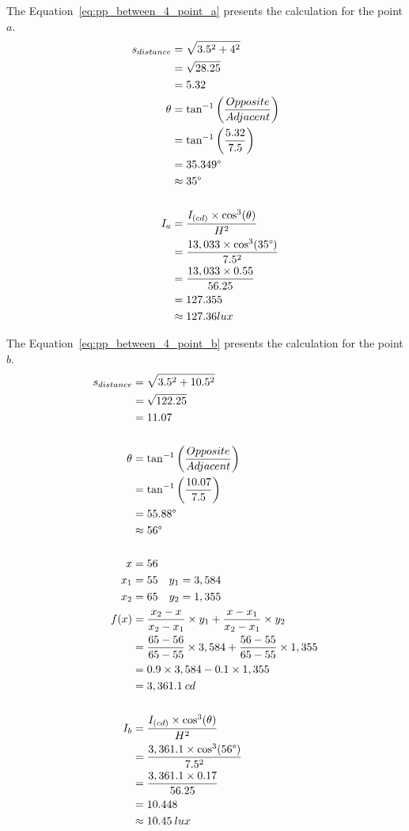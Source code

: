 The Equation~\ref{eq:pp_between_4_point_a} presents the calculation for the point $a$.
\begin{equation}
\begin{split}
s_{distance} & = \sqrt{3.5^2 + 4^2} \\
 & = \sqrt{28.25} \\
 & = 5.32 \\
\theta &= \tan^{-1}\left( \frac{Opposite}{Adjacent} \right) \\
 & = \tan^{-1}\left( \frac{5.32}{7.5} \right) \\
 & = 35.349\degree \\
 & \approx 35\degree\\
\\
I_a &= \frac{I_{(cd)} \times \cos^3(\theta)}{H^2} \\
 &= \frac{13,033 \times \cos^3(35\degree)}{7.5^2} \\
 &= \frac{13,033 \times 0.55}{56.25} \\
 & = 127.355 \\
 & \approx 127.36 lux
\end{split}
\label{eq:pp_between_4_point_a}
\end{equation}

The Equation~\ref{eq:pp_between_4_point_b} presents the calculation for the point $b$.
\begin{equation}
\begin{split}
s_{distance} & = \sqrt{3.5^2 + 10.5^2} \\
 & = \sqrt{122.25} \\
 & = 11.07 \\
\\
\theta &= \tan^{-1}\left( \frac{Opposite}{Adjacent} \right) \\
 & = \tan^{-1}\left( \frac{10.07}{7.5} \right) \\
 & = 55.88\degree \\
 & \approx 56\degree\\
\\
x & = 56 \\
x_1 & = 55 \quad y_1 = 3,584 \\
x_2 & = 65 \quad y_2 = 1,355 \\
f(x) &= \frac{x_2 - x}{x_2 - x_1} \times y_1 +
       \frac{x - x_1}{x_2 - x_1} \times y_2 \\
 &= \frac{65 - 56}{65 - 55} \times 3,584 +
    \frac{56 - 55}{65 - 55} \times 1,355 \\
 & = 0.9 \times 3,584 - 0.1 \times 1,355 \\
 & = 3,361.1\: cd \\
\\
I_b &= \frac{I_{(cd)} \times \cos^3(\theta)}{H^2} \\
 &= \frac{3,361.1 \times \cos^3(56\degree)}{7.5^2} \\
 &= \frac{3,361.1 \times 0.17}{56.25} \\
 & = 10.448 \\
 & \approx 10.45\: lux
\end{split}
\label{eq:pp_between_4_point_b}
\end{equation}

